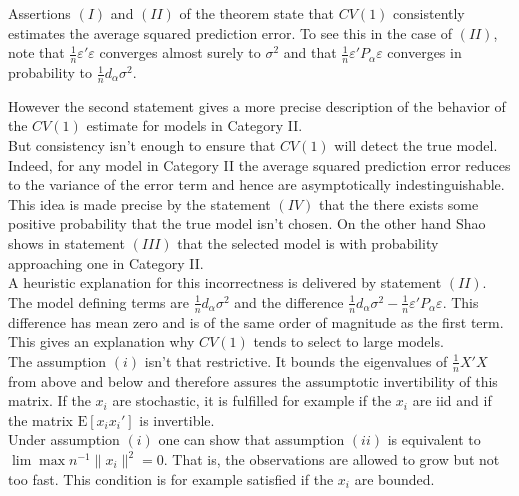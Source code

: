 \documentclass[Research_Module_ES.tex]{subfiles}
\begin{document}
Assertions $(I)$ and $(II)$ of the theorem state that $CV(1)$ consistently estimates the average squared prediction error. To see this in the case of $(II)$, note that $\frac{1}{n}\varepsilon'\varepsilon$ converges almost surely to $\sigma^2$ and that 
$\frac{1}{n}\varepsilon'P_\alpha\varepsilon$ converges in probability to $\frac{1}{n}d_\alpha\sigma^2$.\

However the second statement gives a more precise description of the behavior of the $CV(1)$ estimate for models in Category II. \\

But consistency isn't enough to ensure that $CV(1)$ will detect the true model. 
Indeed, for any model in Category II the average squared prediction error reduces to the variance of the error term and hence are asymptotically indestinguishable. 
This idea is made precise by the statement $(IV)$ that the there exists some positive probability that the true model isn't chosen. On the other hand Shao shows in statement $(III)$ that the selected model is with probability approaching one in Category II.\\

A heuristic explanation for this incorrectness is delivered by statement $(II)$. The model defining terms are $\frac{1}{n}d_\alpha\sigma^2$ and the difference $\frac{1}{n}d_\alpha\sigma^2 - \frac{1}{n}\varepsilon'P_\alpha\varepsilon$. This difference has mean zero and is of the same order of magnitude as the first term. This gives an explanation why $CV(1)$ tends to select to large models.\\

The assumption $(i)$ isn't that restrictive. It bounds the eigenvalues of $\frac{1}{n}X'X$ from above and below and therefore assures the assumptotic invertibility of this matrix. If the $x_i$ are stochastic, it is fulfilled for example if the $x_i$ are iid and if the matrix $\mathrm{E}[x_ix_i']$ is invertible.\\

Under assumption $(i)$ one can show that assumption $(ii)$ is equivalent to 
$\lim \max n^{-1}\lVert x_i\rVert^2=0$. That is, the observations are allowed to grow but not too fast. This condition is for example satisfied if the $x_i$ are bounded.\\
\end{document}
